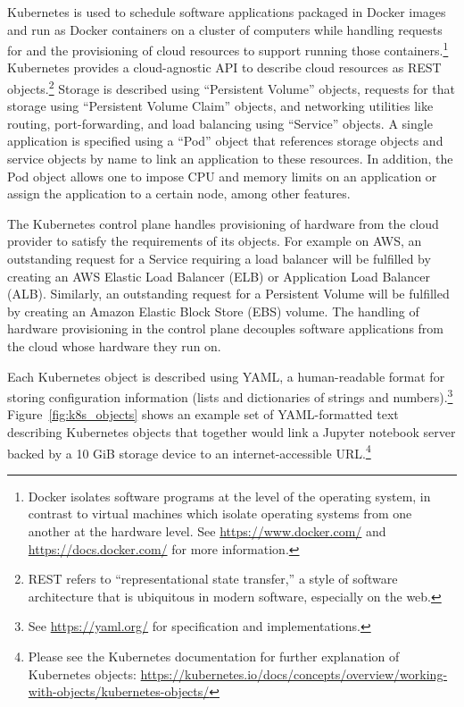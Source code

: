 \documentclass[twocolumn, linenumbers]{aastex631}
\begin{document}
Kubernetes is used to schedule software applications packaged in Docker images and run as Docker containers on a cluster of computers while handling requests for and the provisioning of cloud resources to support running those containers.\footnote{Docker isolates software programs at the level of the operating system, in contrast to virtual machines which isolate operating systems from one another at the hardware level. See \url{https://www.docker.com/} and \url{https://docs.docker.com/} for more information.} Kubernetes provides a cloud-agnostic API to describe cloud resources as REST objects.\footnote{REST refers to ``representational state transfer,'' a style of software architecture that is ubiquitous in modern software, especially on the web.} Storage is described using ``Persistent Volume'' objects, requests for that storage using ``Persistent Volume Claim'' objects, and networking utilities like routing, port-forwarding, and load balancing using ``Service'' objects. A single application is specified using a ``Pod'' object that references storage objects and service objects by name to link an application to these resources. In addition, the Pod object allows one to impose CPU and memory limits on an application or assign the application to a certain node, among other features.

The Kubernetes control plane handles provisioning of hardware from the cloud provider to satisfy the requirements of its objects. For example on AWS, an outstanding request for a Service requiring a load balancer will be fulfilled by creating an AWS Elastic Load Balancer (ELB) or Application Load Balancer (ALB). Similarly, an outstanding request for a Persistent Volume will be fulfilled by creating an Amazon Elastic Block Store (EBS) volume. The handling of hardware provisioning in the control plane decouples software applications from the cloud whose hardware they run on.


Each Kubernetes object is described using YAML, a human-readable format for storing configuration information (lists and dictionaries of strings and numbers).\footnote{See \url{https://yaml.org/} for specification and implementations.} 
Figure~\ref{fig:k8s_objects} shows an example set of YAML-formatted text describing Kubernetes objects that together would link a Jupyter notebook server backed by a 10 GiB storage device to an internet-accessible URL.\footnote{Please see the Kubernetes documentation for further explanation of Kubernetes objects: \url{https://kubernetes.io/docs/concepts/overview/working-with-objects/kubernetes-objects/}}
\end{document}
